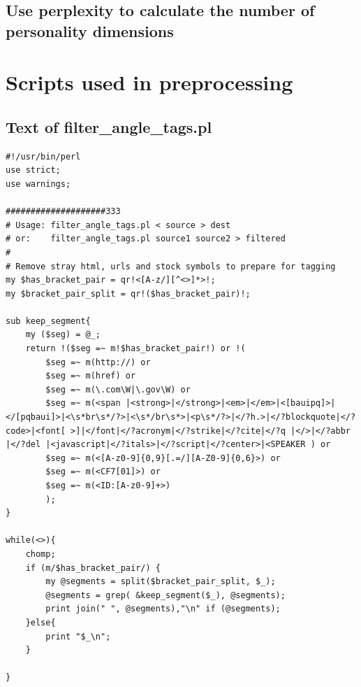 \documentclass[10pt,letterpaper]{book}
\begin{document}
\section{Use perplexity to calculate the number of personality dimensions}

\appendix
\chapter{Scripts used in preprocessing}
\section{Text of filter\_angle\_tags.pl}
\label{app:filterangletags}
\lstset{language=Perl}
\begin{lstlisting}
#!/usr/bin/perl
use strict;
use warnings;

####################333
# Usage: filter_angle_tags.pl < source > dest
# or:    filter_angle_tags.pl source1 source2 > filtered
#
# Remove stray html, urls and stock symbols to prepare for tagging
my $has_bracket_pair = qr!<[A-z/][^<>]*>!;
my $bracket_pair_split = qr!($has_bracket_pair)!;

sub keep_segment{
    my ($seg) = @_;
    return !($seg =~ m!$has_bracket_pair!) or !(
        $seg =~ m(http://) or
        $seg =~ m(href) or
        $seg =~ m(\.com\W|\.gov\W) or
        $seg =~ m(<span |<strong>|</strong>|<em>|</em>|<[bauipq]>|</[pqbaui]>|<\s*br\s*/?>|<\s*/br\s*>|<p\s*/?>|</?h.>|</?blockquote|</?code>|<font[ >]|</font|</?acronym|</?strike|</?cite|</?q |</>|</?abbr |</?del |<javascript|</?itals>|</?script|</?center>|<SPEAKER ) or
        $seg =~ m(<[A-z0-9]{0,9}[.=/][A-Z0-9]{0,6}>) or
        $seg =~ m(<CF7[01]>) or
        $seg =~ m(<ID:[A-z0-9]+>)
        );
}

while(<>){
    chomp;
    if (m/$has_bracket_pair/) {
        my @segments = split($bracket_pair_split, $_);
        @segments = grep( &keep_segment($_), @segments);
        print join(" ", @segments),"\n" if (@segments);
    }else{
        print "$_\n";
    }

}
\end{lstlisting}
\end{document}

